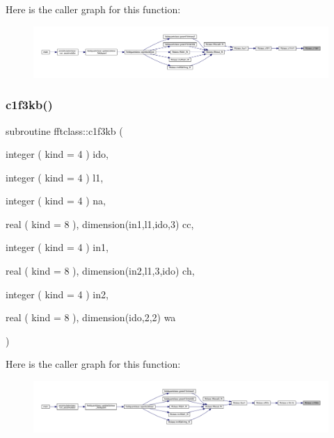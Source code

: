 Here is the caller graph for this function\+:\nopagebreak
\begin{figure}[H]
\begin{center}
\leavevmode
\includegraphics[width=350pt]{namespacefftclass_a0535bb9fc14fda824be9053638cdfb2a_icgraph}
\end{center}
\end{figure}
\mbox{\label{namespacefftclass_af43eb54e0a7553e31585e67ad240b860}} 
\subsubsection{\texorpdfstring{c1f3kb()}{c1f3kb()}}
{\footnotesize\ttfamily subroutine fftclass\+::c1f3kb (\begin{DoxyParamCaption}\item[{integer ( kind = 4 )}]{ido,  }\item[{integer ( kind = 4 )}]{l1,  }\item[{integer ( kind = 4 )}]{na,  }\item[{real ( kind = 8 ), dimension(in1,l1,ido,3)}]{cc,  }\item[{integer ( kind = 4 )}]{in1,  }\item[{real ( kind = 8 ), dimension(in2,l1,3,ido)}]{ch,  }\item[{integer ( kind = 4 )}]{in2,  }\item[{real ( kind = 8 ), dimension(ido,2,2)}]{wa }\end{DoxyParamCaption})}

Here is the caller graph for this function\+:\nopagebreak
\begin{figure}[H]
\begin{center}
\leavevmode
\includegraphics[width=350pt]{namespacefftclass_af43eb54e0a7553e31585e67ad240b860_icgraph}
\end{center}
\end{figure}
\mbox{\label{namespacefftclass_ae586c2f39848274e0454c7d161522c31}} 
